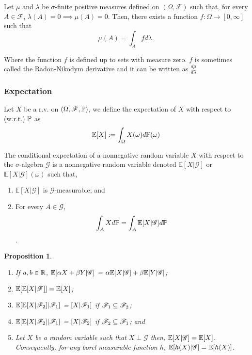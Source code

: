 \documentclass{beamer}
\newtheorem{proposition}{Proposition}[section]
\begin{document}
\begin{frame}
\begin{theorem}\label{th:radon-nikodym}
Let $\mu$ and $\lambda$ be $\sigma$-finite positive measures defined on $(\Omega, \mathscr{F})$ such that, for every $A \in \mathscr{F}$, $\lambda(A) = 0 \implies \mu(A)= 0$. Then, there exists a function $f: \Omega \to [0, \infty]$ such that
\[
	\mu(A) = \int_A f d\lambda.
\]

Where the function $f$ is defined up to sets with measure zero. $f$ is sometimes called the Radon-Nikodym derivative and it can be written as $\frac{d\mu}{d\lambda}$
\end{theorem}

\end{frame}

\begin{frame}
\frametitle{Expectation}
	\begin{definition}
		Let $X$ be a r.v. on $(\Omega, \mathscr{F}, \mathbb{P})$, we define the expectation of $X$ with respect to (w.r.t.) $\mathbb{P}$ as
		\[
			\mathbb{E}[X] := \int_\Omega X(\omega) d\mathbb{P}(\omega)
		\]
	\end{definition}
	
	\begin{definition}
The conditional expectation of a nonnegative random variable $X$ with respect to the $\sigma$-algebra $\mathscr{G}$ is a nonnegative random variable denoted $\mathbb{E}[X | \mathscr{G}]$ or $\mathbb{E}[X | \mathscr{G}](\omega)$ such that,
\begin{enumerate}
	\item $\mathbb{E}[X | \mathscr{G}]$ is $\mathscr{G}$-measurable; and
	\item For every $A \in \mathscr{G}$,
	\[\int_A X d\mathbb{P} = \int_A \mathbb{E}[X | \mathscr{G}] d\mathbb{P}\].
\end{enumerate}
\end{definition}
\end{frame}

\begin{frame}
\begin{proposition}
	\begin{enumerate}
		\item If $a, b \in \mathbb{R}$, $\mathbb{E}[\alpha X + \beta Y | \mathscr{G}]$ = $\alpha \mathbb{E}[X | \mathscr{G}] + \beta\mathbb{E}[Y | \mathscr{G}]$;
		\item $\mathbb{E}[\mathbb{E}[X | \mathscr{F}]] = \mathbb{E}[X]$;
		\item $\mathbb{E}[\mathbb{E}[X | \mathscr{F}_2] | \mathscr{F}_1]$ = $[X | \mathscr{F}_1]$ if $\mathscr{F}_1 \subseteq \mathscr{F}_2$;
		\item $\mathbb{E}[\mathbb{E}[X | \mathscr{F}_2] | \mathscr{F}_1]$ = $[X | \mathscr{F}_2]$ if $\mathscr{F}_2 \subseteq \mathscr{F}_1$; and
		\item Let $X$ be a random variable such that $X \perp \mathscr{G}$ then, $\mathbb{E}[X|\mathscr{G}] = \mathbb{E}[X]$. Consequently, for any borel-measurable function $h$, $\mathbb{E}[h(X)|\mathscr{G}] = \mathbb{E}[h(X)]$.
	\end{enumerate}
\end{proposition}
\end{frame}
\end{document}
